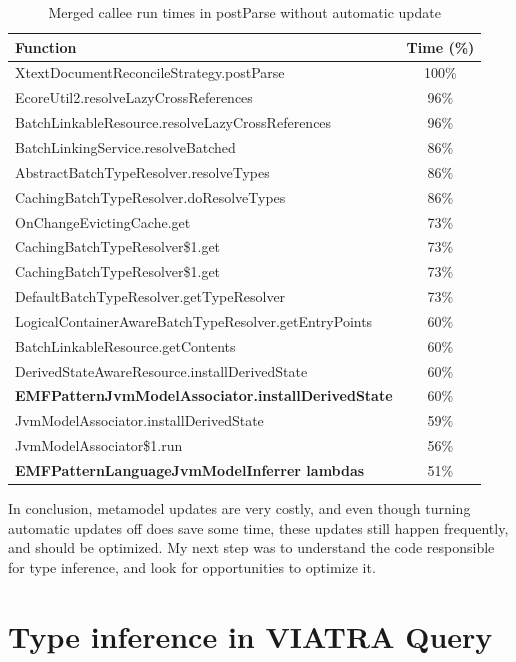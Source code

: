 \documentclass[11pt,a4paper,oneside]{report}
\begin{document}
\begin{table}[ht]
    \footnotesize
    \centering
    \begin{tabular}{ l c }
        \toprule
        Function & Time (\%) \\
        \midrule
        XtextDocumentReconcileStrategy.postParse & 100\% \\
        EcoreUtil2.resolveLazyCrossReferences & 96\% \\
        BatchLinkableResource.resolveLazyCrossReferences & 96\% \\
        BatchLinkingService.resolveBatched & 86\% \\
        AbstractBatchTypeResolver.resolveTypes & 86\% \\
        CachingBatchTypeResolver.doResolveTypes & 86\% \\
        OnChangeEvictingCache.get & 73\% \\
        CachingBatchTypeResolver\$1.get & 73\% \\
        CachingBatchTypeResolver\$1.get & 73\% \\
        DefaultBatchTypeResolver.getTypeResolver & 73\% \\
        LogicalContainerAwareBatchTypeResolver.getEntryPoints & 60\% \\
        BatchLinkableResource.getContents & 60\% \\
        DerivedStateAwareResource.installDerivedState & 60\% \\
        \textbf{EMFPatternJvmModelAssociator.installDerivedState} & 60\% \\
        JvmModelAssociator.installDerivedState & 59\% \\
        JvmModelAssociator\$1.run & 56\% \\
        \textbf{EMFPatternLanguageJvmModelInferrer lambdas} & 51\% \\
        \bottomrule
    \end{tabular}
    \caption{Merged callee run times in postParse without automatic update}
    \label{tab:postparse-no-auto-update}
\end{table}

In conclusion, metamodel updates are very costly, and even though turning
automatic updates off does save some time, these updates still happen
frequently, and should be optimized. My next step was to understand the code
responsible for type inference, and look for opportunities to optimize it.

\section{Type inference in VIATRA Query}
\end{document}
